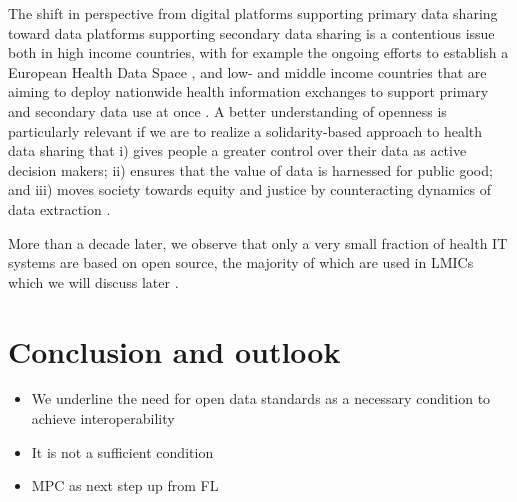 \documentclass[
  authoryear]{elsarticle}
\providecommand{\tightlist}{%
  \setlength{\itemsep}{0pt}\setlength{\parskip}{0pt}}\usepackage{longtable,booktabs,array}
\begin{document}
The shift in perspective from digital platforms supporting primary data
sharing toward data platforms supporting secondary data sharing is a
contentious issue both in high income countries, with for example the
ongoing efforts to establish a European Health Data Space
\citep{otto2022designing}, and low- and middle income countries that are
aiming to deploy nationwide health information exchanges to support
primary and secondary data use at once \citep{mamuye2022health}. A
better understanding of openness is particularly relevant if we are to
realize a solidarity-based approach to health data sharing that i) gives
people a greater control over their data as active decision makers; ii)
ensures that the value of data is harnessed for public good; and iii)
moves society towards equity and justice by counteracting dynamics of
data extraction
\citep{kickbusch2021lancet, prainsack2022data, prainsack2023beyond}.

More than a decade later, we observe that only a very small fraction of
health IT systems are based on open source, the majority of which are
used in LMICs which we will discuss later \citep{digitalpublicgoods}.

\section{Conclusion and outlook}\label{conclusion-and-outlook}

\begin{itemize}
\tightlist
\item
  We underline the need for open data standards as a necessary condition
  to achieve interoperability
\item
  It is not a sufficient condition
\item
  MPC as next step up from FL
\end{itemize}


  
\end{document}
